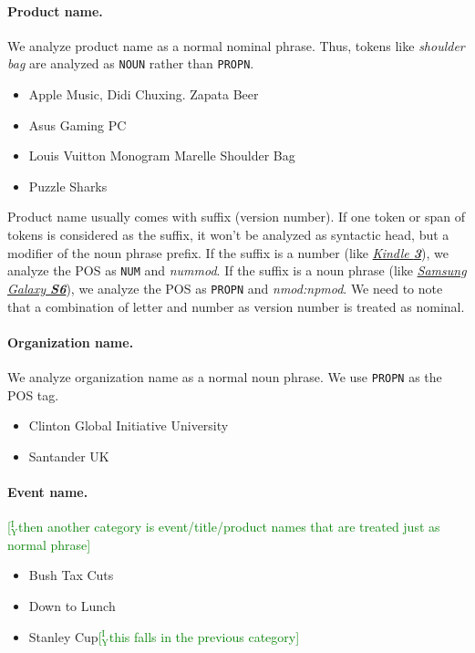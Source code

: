 \documentclass[11pt,a4paper]{article}
\newcommand{\yicomment}[1]{\textcolor{green}{[$_\mathrm{Y}^\mathrm{I}$#1]}}
\begin{document}
\paragraph{Product name.}
We analyze product name as a normal nominal phrase.
Thus, tokens like \textit{shoulder bag} are analyzed as \texttt{NOUN} rather than \texttt{PROPN}.
\begin{itemize}
	\item Apple Music, Didi Chuxing. Zapata Beer
	\item Asus Gaming PC
	\item Louis Vuitton Monogram Marelle Shoulder Bag
	\item Puzzle Sharks
\end{itemize}

Product name usually comes with suffix (version number).
If one token or span of tokens is considered as the suffix, 
it won't be analyzed as syntactic head, but a modifier of the noun phrase prefix.
If the suffix is a number (like \underline{\textit{Kindle \textbf{3}}}), we analyze the POS as \texttt{NUM} and \textit{nummod}.
If the suffix is a noun phrase (like \underline{\textit{Samsung Galaxy \textbf{S6}}}), we analyze the POS as \texttt{PROPN} and \textit{nmod:npmod}.
We need to note that a combination of letter and number as version number is treated as nominal.

\paragraph{Organization name.} 
We analyze organization name as a normal noun phrase.
We use \texttt{PROPN} as the POS tag.
\begin{itemize}
	\item Clinton Global Initiative University
	\item Santander UK
\end{itemize}

\paragraph{Event name.}\yicomment{then another category is event/title/product names that are treated just as normal phrase}
\begin{itemize}
	\item Bush Tax Cuts
	\item Down to Lunch
	\item Stanley Cup\yicomment{this falls in the previous category}
\end{itemize}
\end{document}
